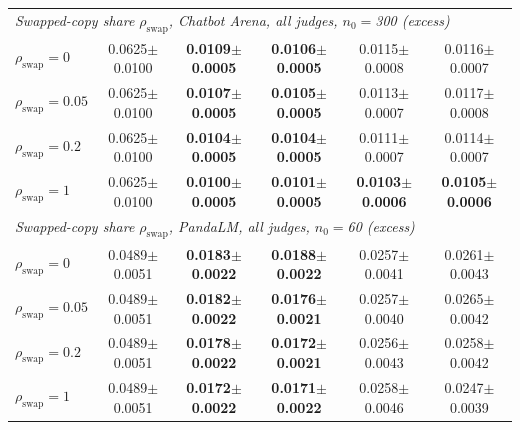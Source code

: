 \begin{table}[!t]
{\begin{tabular}{lccccc}
\midrule
\multicolumn{6}{l}{\emph{Swapped-copy share $\rho_{\mathrm{swap}}$, Chatbot Arena, all judges, $n_0=$300 (excess)}} \\
\quad $\rho_{\mathrm{swap}}=0$ & 0.0625{\scriptsize$\pm$0.0100} & \textbf{0.0109{\scriptsize$\pm$0.0005}} & \textbf{0.0106{\scriptsize$\pm$0.0005}} & 0.0115{\scriptsize$\pm$0.0008} & 0.0116{\scriptsize$\pm$0.0007} \\
\quad $\rho_{\mathrm{swap}}=0.05$ & 0.0625{\scriptsize$\pm$0.0100} & \textbf{0.0107{\scriptsize$\pm$0.0005}} & \textbf{0.0105{\scriptsize$\pm$0.0005}} & 0.0113{\scriptsize$\pm$0.0007} & 0.0117{\scriptsize$\pm$0.0008} \\
\quad $\rho_{\mathrm{swap}}=0.2$ & 0.0625{\scriptsize$\pm$0.0100} & \textbf{0.0104{\scriptsize$\pm$0.0005}} & \textbf{0.0104{\scriptsize$\pm$0.0005}} & 0.0111{\scriptsize$\pm$0.0007} & 0.0114{\scriptsize$\pm$0.0007} \\
\quad $\rho_{\mathrm{swap}}=1$ & 0.0625{\scriptsize$\pm$0.0100} & \textbf{0.0100{\scriptsize$\pm$0.0005}} & \textbf{0.0101{\scriptsize$\pm$0.0005}} & \textbf{0.0103{\scriptsize$\pm$0.0006}} & \textbf{0.0105{\scriptsize$\pm$0.0006}} \\
\midrule
\multicolumn{6}{l}{\emph{Swapped-copy share $\rho_{\mathrm{swap}}$, PandaLM, all judges, $n_0=$60 (excess)}} \\
\quad $\rho_{\mathrm{swap}}=0$ & 0.0489{\scriptsize$\pm$0.0051} & \textbf{0.0183{\scriptsize$\pm$0.0022}} & \textbf{0.0188{\scriptsize$\pm$0.0022}} & 0.0257{\scriptsize$\pm$0.0041} & 0.0261{\scriptsize$\pm$0.0043} \\
\quad $\rho_{\mathrm{swap}}=0.05$ & 0.0489{\scriptsize$\pm$0.0051} & \textbf{0.0182{\scriptsize$\pm$0.0022}} & \textbf{0.0176{\scriptsize$\pm$0.0021}} & 0.0257{\scriptsize$\pm$0.0040} & 0.0265{\scriptsize$\pm$0.0042} \\
\quad $\rho_{\mathrm{swap}}=0.2$ & 0.0489{\scriptsize$\pm$0.0051} & \textbf{0.0178{\scriptsize$\pm$0.0022}} & \textbf{0.0172{\scriptsize$\pm$0.0021}} & 0.0256{\scriptsize$\pm$0.0043} & 0.0258{\scriptsize$\pm$0.0042} \\
\quad $\rho_{\mathrm{swap}}=1$ & 0.0489{\scriptsize$\pm$0.0051} & \textbf{0.0172{\scriptsize$\pm$0.0022}} & \textbf{0.0171{\scriptsize$\pm$0.0022}} & 0.0258{\scriptsize$\pm$0.0046} & 0.0247{\scriptsize$\pm$0.0039} \\
\bottomrule
\end{tabular}}
\end{table}
